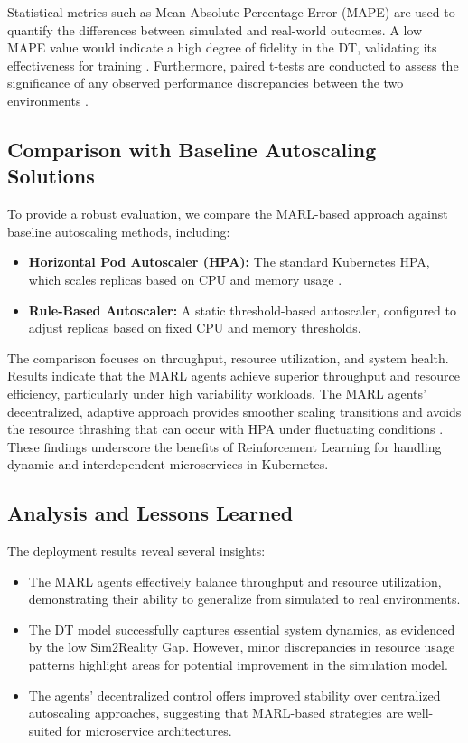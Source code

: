 \documentclass[conference]{IEEEtran}
\begin{document}
Statistical metrics such as Mean Absolute Percentage Error (MAPE) are used to quantify the differences between simulated and real-world outcomes. A low MAPE value would indicate a high degree of fidelity in the DT, validating its effectiveness for training \cite{tan_nn_resource_approx}. Furthermore, paired t-tests are conducted to assess the significance of any observed performance discrepancies between the two environments \cite{wu_multi_objective_rl}.

\subsection{Comparison with Baseline Autoscaling Solutions}

To provide a robust evaluation, we compare the MARL-based approach against baseline autoscaling methods, including:
\begin{itemize}
    \item \textbf{Horizontal Pod Autoscaler (HPA):} The standard Kubernetes HPA, which scales replicas based on CPU and memory usage \cite{hpa_design}.
    \item \textbf{Rule-Based Autoscaler:} A static threshold-based autoscaler, configured to adjust replicas based on fixed CPU and memory thresholds.
\end{itemize}

The comparison focuses on throughput, resource utilization, and system health. Results indicate that the MARL agents achieve superior throughput and resource efficiency, particularly under high variability workloads. The MARL agents' decentralized, adaptive approach provides smoother scaling transitions and avoids the resource thrashing that can occur with HPA under fluctuating conditions \cite{zhang_marl_k8s}. These findings underscore the benefits of Reinforcement Learning for handling dynamic and interdependent microservices in Kubernetes.

\subsection{Analysis and Lessons Learned}

The deployment results reveal several insights:
\begin{itemize}
    \item The MARL agents effectively balance throughput and resource utilization, demonstrating their ability to generalize from simulated to real environments.
    \item The DT model successfully captures essential system dynamics, as evidenced by the low Sim2Reality Gap. However, minor discrepancies in resource usage patterns highlight areas for potential improvement in the simulation model.
    \item The agents’ decentralized control offers improved stability over centralized autoscaling approaches, suggesting that MARL-based strategies are well-suited for microservice architectures.
\end{itemize}
\end{document}
